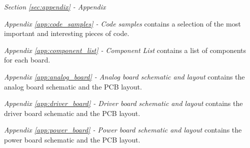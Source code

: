 \medskip
\emph{Section \ref{sec:appendix} - Appendix} 

\quad \textit{Appendix \ref{app:code_samples} - Code samples} contains a selection of the most important and interesting pieces of code.

\quad \textit{Appendix \ref{app:component_list} - Component List} contains a list of components for each board.

\quad \textit{Appendix \ref{app:analog_board} - Analog board schematic and layout} contains the analog board schematic and the PCB layout.

\quad \textit{Appendix \ref{app:driver_board} - Driver board schematic and layout} contains the driver board schematic and the PCB layout.

\quad \textit{Appendix \ref{app:power_board} - Power board schematic and layout} contains the power board schematic and the PCB layout.
